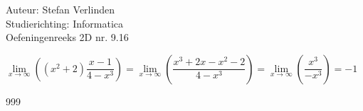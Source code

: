\documentclass[a4paper]{article}
\begin{document}
  
\noindent \large Auteur: Stefan Verlinden \\
\noindent \large Studierichting: Informatica\\
\noindent \large Oefeningenreeks 2D nr. 9.16\\

\medskip

\normalsize

$ \lim\limits_{x\to\infty}\left((x^2+2)\dfrac{x-1}{4-x^3}\right) = \lim\limits_{x\to\infty}\left(\dfrac{x^3+2x-x^2-2}{4-x^3}\right) = \lim\limits_{x\to\infty}\left(\dfrac{x^3}{-x^3}\right) = -1$

\begin{thebibliography}{999}
\end{thebibliography}
\end{document}
